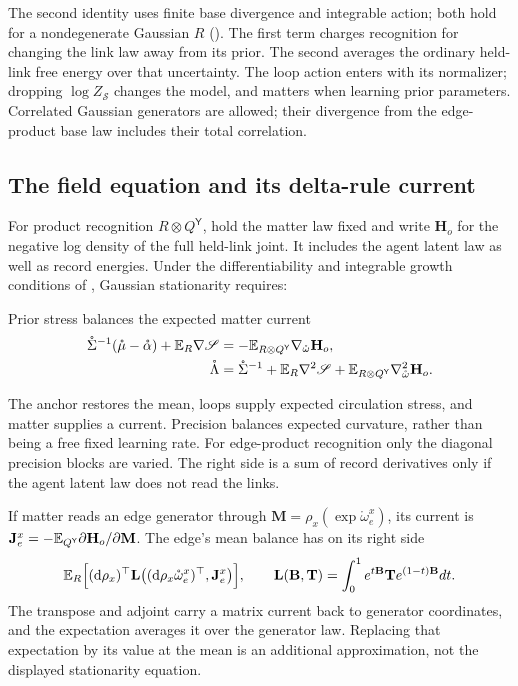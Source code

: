 The second identity uses finite base divergence and integrable action; both hold for a
nondegenerate Gaussian $R$ (). The first term charges
recognition for changing the link law away from its prior. The second averages the ordinary
held-link free energy over that uncertainty. The loop action enters with its normalizer;
dropping $\log Z_{\mathscr S}$ changes the model, and matters when learning prior parameters.
Correlated Gaussian generators are allowed; their divergence from the edge-product base law
includes their total correlation.

\subsection{The field equation and its delta-rule current}

For product recognition $R\otimes Q^{\mathsf Y}$, hold the matter law fixed and write
$\mathbf H_o$ for the negative log density of the full held-link joint. It includes the agent
latent law as well as record energies. Under the differentiability and integrable growth
conditions of , Gaussian stationarity requires:

\begin{keyequation}{Prior stress balances the expected matter current}
\[
\begin{aligned}
\mathring\Sigma^{-1}(\mathring\mu-\mathring\alpha)+\mathbb E_R\nabla\mathscr S
&=-\mathbb E_{R\otimes Q^{\mathsf Y}}\nabla_{\mathring\omega}\mathbf H_o,\\
\mathring\Lambda
&=\mathring\Sigma^{-1}+\mathbb E_R\nabla^2\mathscr S
+\mathbb E_{R\otimes Q^{\mathsf Y}}\nabla^2_{\mathring\omega}\mathbf H_o.
\end{aligned}
\]
\end{keyequation}

The anchor restores the mean, loops supply expected circulation stress, and matter supplies
a current. Precision balances expected curvature, rather than being a free fixed learning
rate. For edge-product recognition only the diagonal precision blocks are varied. The
right side is a sum of record derivatives only if the agent latent law does not read the links.

If matter reads an edge generator through $\mathbf M=\rho_x(\exp\mathring\omega^x_e)$,
its current is $\mathbf J^x_e=-\mathbb E_{Q^{\mathsf Y}}\partial\mathbf H_o/\partial\mathbf M$.
The edge's mean balance has on its right side
\[
\mathbb E_R\Bigl[(\mathrm d\rho_x)^\top
\mathbf L\bigl((\mathrm d\rho_x\mathring\omega^x_e)^\top,\mathbf J^x_e\bigr)\Bigr],
\qquad
\mathbf L(\mathbf B,\mathbf T)=\int_0^1e^{t\mathbf B}\mathbf Te^{(1-t)\mathbf B}dt.
\]
The transpose and adjoint carry a matrix current back to generator coordinates, and the
expectation averages it over the generator law. Replacing that expectation by its value at
the mean is an additional approximation, not the displayed stationarity equation.

